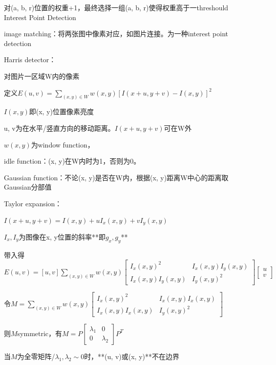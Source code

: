 \documentclass[UTF8]{ctexart}
\begin{document}
  \quad \quad \quad 对(a, b, r)位置的权重+1，最终选择一组(a, b, r)使得权重高于一threshould\\
Interest Point Detection 

  image matching：将两张图中像素对应，如图片连接。为一种interest point detection 

  Harris detector：

  \quad 对图片一区域W内的像素

  \quad 定义$E(u, v) = \sum_{(x, y) \in W} w(x, y)[I(x + u, y + v) - I(x, y)]^2$

  \quad \quad $I(x, y)$即(x, y)位置像素亮度

  \quad \quad u, v为在水平/竖直方向的移动距离。$I(x + u, y + v)$可在W外

  \quad \quad $w(x, y)$为window function，
  
  \quad \quad \quad idle function：(x, y)在W内时为1，否则为0。
  
  \quad \quad \quad Gaussian function：不论(x, y)是否在W内，根据(x, y)距离W中心的距离取Gaussian分部值
  
  \quad Taylor expansion： 

  \quad \quad $I(x + u, y + v) = I(x, y) + uI_x(x, y) + vI_y(x, y)$

  \quad \quad \quad $I_x, I_y$为图像在x, y位置的斜率**即$g_x, g_y$**

  \quad \quad 带入得$E(u, v) = [u, v]\sum_{(x, y) \in W}w(x, y)
    \begin{bmatrix}
      I_x(x, y)^2 & I_x(x, y)I_y(x, y) \\
      I_x(x, y)I_y(x, y) & I_y(x, y)^2
      \end{bmatrix}
    \begin{bmatrix}
      u \\ 
      v
      \end{bmatrix}$

  \quad \quad 令$M = \sum_{(x, y) \in W}w(x, y)
    \begin{bmatrix}
      I_x(x, y)^2 & I_x(x, y)I_x(x, y) \\
      I_x(x, y)I_x(x, y) & I_y(x, y)^2
      \end{bmatrix}$

  \quad \quad 则$M$symmetric，有$M = P 
    \begin{bmatrix}
      \lambda_1 & 0 \\
      0 & \lambda_2
      \end{bmatrix} P^T$

  \quad \quad \quad 当$M$为全零矩阵/$\lambda_1,\lambda_2 \sim 0$时，**(u, v)或(x, y)**不在边界
\end{document}
